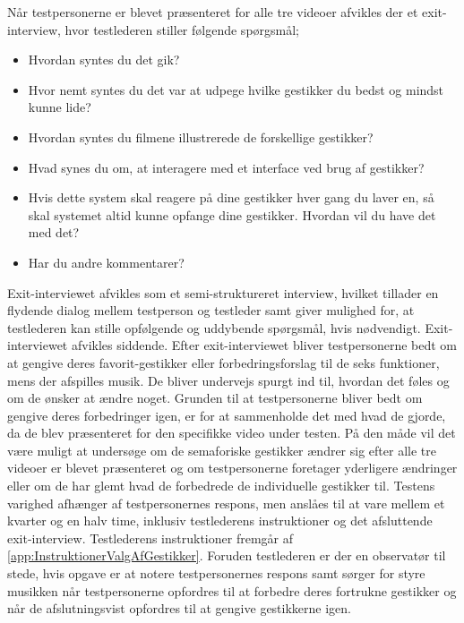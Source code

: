 Når testpersonerne er blevet præsenteret for alle tre videoer afvikles der et exit-interview, hvor testlederen stiller følgende spørgsmål; \blankline
%
\begin{itemize}
  \item Hvordan syntes du det gik? 
  \item Hvor nemt syntes du det var at udpege hvilke gestikker du bedst og mindst kunne lide? 
  \item Hvordan syntes du filmene illustrerede de forskellige gestikker? 
  \item Hvad synes du om, at interagere med et interface ved brug af gestikker? 
  \item Hvis dette system skal reagere på dine gestikker hver gang du laver en, så skal systemet altid kunne opfange dine gestikker. Hvordan vil du have det med det? 
  \item Har du andre kommentarer?\blankline
\end{itemize}
\noindent
%
Exit-interviewet afvikles som et semi-struktureret interview, hvilket tillader en flydende dialog mellem testperson og testleder samt giver mulighed for, at testlederen kan stille opfølgende og uddybende spørgsmål, hvis nødvendigt. Exit-interviewet afvikles siddende. Efter exit-interviewet bliver testpersonerne bedt om at gengive deres favorit-gestikker eller forbedringsforslag til de seks funktioner, mens der afspilles musik. De bliver undervejs spurgt ind til, hvordan det føles og om de ønsker at ændre noget. Grunden til at testpersonerne bliver bedt om gengive deres forbedringer igen, er for at sammenholde det med hvad de gjorde, da de blev præsenteret for den specifikke video under testen. På den måde vil det være muligt at undersøge om de semaforiske gestikker ændrer sig efter alle tre videoer er blevet præsenteret og om testpersonerne foretager yderligere ændringer eller om de har glemt hvad de forbedrede de individuelle gestikker til. \blankline   
%
Testens varighed afhænger af testpersonernes respons, men anslåes til at vare mellem et kvarter og en halv time, inklusiv testlederens instruktioner og det afsluttende exit-interview. Testlederens instruktioner fremgår af \autoref{app:InstruktionerValgAfGestikker}. Foruden testlederen er der en observatør til stede, hvis opgave er at notere testpersonernes respons samt sørger for styre musikken når testpersonerne opfordres til at forbedre deres fortrukne gestikker og når de afslutningsvist opfordres til at gengive gestikkerne igen. 
%
